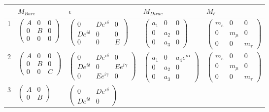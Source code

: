 \documentclass[nofootinbib,showpacs]{revtex4}
\begin{document}
\begin{table}
\begin{center}
\begin{tabular}{|l|l|l|l|l|}
\hline
&$M_{Bare}$&$\epsilon$&$M_{Dirac}$&$M_\ell$\\
\hline \hline
1&
$\left(\begin{array}{ccc}A&0&0\\0&B&0\\0&0&0\end{array}\right)$&
$\left(\begin{array}{ccc}0&D e^{i \delta}&0\\D e^{i \delta}&0&0\\0&0&E\end{array}\right)$&
$\left(\begin{array}{ccc}a_1&0&0\\0&a_2&0\\0&a_3&0\end{array}\right)$&
$\left(\begin{array}{ccc}m_e&0&0\\0&m_\mu&0\\0&0&m_\tau\end{array}\right)$
\\
\hline
2&
$\left(\begin{array}{ccc}A&0&0\\0&B&0\\0&0&C\end{array}\right)$&
$\left(\begin{array}{ccc}0&D e^{i \delta}&0\\D e^{i \delta}&0&E e^{i \gamma}\\0&E e^{i \gamma}&0\end{array}\right)$&
$\left(\begin{array}{ccc}a_1&0&a_4 e^{i \alpha}\\0&a_2&0\\0&a_3&0\end{array}\right)$&
$\left(\begin{array}{ccc}m_e&0&0\\0&m_\mu&0\\0&0&m_\tau\end{array}\right)$
\\
\hline
3&
$\left(\begin{array}{ccc}A&0\\0&B\end{array}\right)$&
$\left(\begin{array}{ccc}0&D e^{i \delta}\\D e^{i \delta}&0\end{array}\right)$&

\end{tabular}
\end{center}
\end{table}
\end{document}
